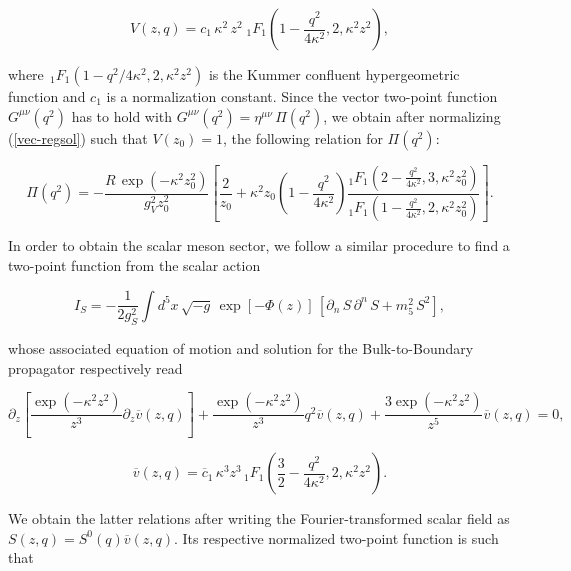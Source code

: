 \documentclass{PoS}
\begin{document}
\begin{equation}
V(z,q)=c_{1}\,\kappa^{2}\,z^{2}\,\text{}_{\,1}F_{1}\left(1-\frac{q^{2}}{4\kappa^{2}},2,\kappa^{2}z^{2}\right),
\label{vec-regsol}
\end{equation}

\noindent where $\text{}_{\,1}F_{1}(1-q^{2}/4\kappa^{2},2,\kappa^{2}z^{2})$ is the Kummer confluent hypergeometric function and $c_{1}$ is a normalization constant. Since the vector two-point function $G^{\mu\nu}(q^{2})$ has to hold with $G^{\mu\nu}(q^{2})=\eta^{\mu\nu}\,\Pi(q^{2})$, we obtain after normalizing (\ref{vec-regsol}) such that $V(z_{0})=1$, the following relation for $\Pi(q^{2})$:

\begin{equation}
\Pi(q^{2})=-\frac{R\,\exp(-\kappa^{2}z_{0}^{2})}{g_{V}^{2}z_{0}^{2}}\left[\frac{2}{z_{0}}+\kappa^{2}z_{0}\left(1-\frac{q^{2}}{4\kappa^{2}}\right)\frac{_{1}F_{1}\left(2-\frac{q^{2}}{4\kappa^{2}},3,\kappa^{2}z_{0}^{2}\right)}{_{1}F_{1}\left(1-\frac{q^{2}}{4\kappa^{2}},2,\kappa^{2}z_{0}^{2}\right)}\right].
\label{pi-factor2}
\end{equation} 

In order to obtain the scalar meson sector, we follow a similar procedure to find a two-point function from the scalar action

\begin{equation}
I_{S}=-\frac{1}{2g_{S}^{2}}\int{d^{5}x\,\sqrt{-g}\,\exp[-\Phi\left(z\right)]\,\left[\partial_n\,S\,\partial^n\,S+m_5^2\,S^2\right]},
\label{scalar-action}
\end{equation}

\noindent whose associated equation of motion and solution for the Bulk-to-Boundary propagator respectively read

\begin{equation}
\partial_{z}\left[\frac{\exp(-\kappa^{2}z^{2})}{z^{3}}\partial_{z}\overline{v}(z,q)\right]+\frac{\exp(-\kappa^{2}z^{2})}{z^{3}}q^{2}\overline{v}(z,q)+\frac{3\exp(-\kappa^{2}z^{2})}{z^{5}}\overline{v}(z,q)=0,
\label{scalar-eom-vz}
\end{equation}

\begin{equation}
\overline{v}(z,q)=\overline{c}_{1}\,\kappa^{3}z^{3}\,\text{}_{1}F_{1}\left(\frac{3}{2}-\frac{q^{2}}{4\kappa^{2}},2,\kappa^{2}z^{2}\right).
\label{scalar-propbtb}
\end{equation}

We obtain the latter relations after writing the Fourier-transformed scalar field as $S(z,q)=S^{0}(q)\overline{v}(z,q)$. Its respective normalized two-point function is such that 
\end{document}
